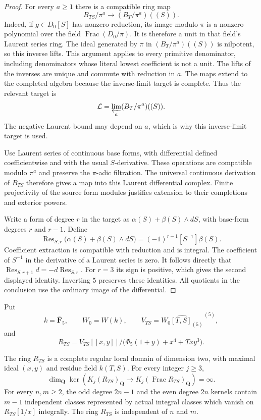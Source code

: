 \begin{proof}
For every $a\geq1$ there is a compatible ring map
\[
 B_{TS}/\pi^a
       \longrightarrow (B_T/\pi^a)((S)).
\]
Indeed, if $g\in D_0[S]$ has nonzero reduction, its image modulo
$\pi$ is a nonzero polynomial over the field
$\operatorname{Frac}(D_0/\pi)$.  It is therefore a unit in that
field's Laurent series ring.  The ideal generated by $\pi$ in
$(B_T/\pi^a)((S))$ is nilpotent, so this inverse lifts.  This
argument applies to every primitive denominator, including
denominators whose literal lowest coefficient is not a unit.
The lifts of the inverses are unique and commute with reduction
in $a$.  The maps extend to the completed algebra because the
inverse-limit target is complete.  Thus the relevant target is
\[
 \mathcal L=\varprojlim_a(B_T/\pi^a)((S)).
\]
The negative Laurent bound may depend on $a$, which is why this
inverse-limit target is used.

Use Laurent series of continuous base forms, with differential
defined coefficientwise and with the usual $S$-derivative.
These operations are compatible modulo $\pi^a$ and preserve
the $\pi$-adic filtration.  The universal continuous derivation
of $B_{TS}$ therefore gives a map into this Laurent differential
complex.  Finite projectivity of the source form modules
justifies extension to their completions and exterior powers.

Write a form of degree $r$ in the target as
$\alpha(S)+\beta(S)\wedge dS$, with base-form degrees $r$
and $r-1$.  Define
\[
 \operatorname{Res}_{S,r}
       \bigl(\alpha(S)+\beta(S)\wedge dS\bigr)
      =(-1)^{r-1}[S^{-1}]\beta(S).
\]
Coefficient extraction is compatible with reduction and is
integral.  The coefficient of $S^{-1}$ in the derivative of a
Laurent series is zero.  It follows directly that
$\operatorname{Res}_{S,r+1}d=-d\operatorname{Res}_{S,r}$.
For $r=3$ its sign is positive, which gives the second displayed
identity.  Inverting $5$ preserves these identities.  All
quotients in the conclusion use the ordinary image of the
differential.
\end{proof}

Put
\[
 k=\overline{\mathbf F}_5,\qquad W_0=W(k),\qquad
 V_{TS}=\widehat{W_0[T,S]_{(5)}}^{\,(5)},
\]
and
\[
 R_{TS}=V_{TS}[[x,y]]/
       \bigl(\Phi_5(1+y)+x^4+Txy^3\bigr).
\]

\begin{theorem}
\label{d2ext:dimtwoCompleteAllDegreesInfiniteRank}
The ring $R_{TS}$ is a complete regular local domain of dimension
two, with maximal ideal $(x,y)$ and residue field $k(T,S)$.
For every integer $j\geq3$,
\[
 \dim_{\mathbf Q}\ker\!\left(
 K_j(R_{TS})_{\mathbf Q}\longrightarrow
 K_j(\operatorname{Frac}R_{TS})_{\mathbf Q}\right)=\infty.
\]
For every $n,m\geq2$, the odd degree $2n-1$ and the even degree
$2n$ kernels contain $m-1$ independent classes represented by
actual integral classes which vanish on $R_{TS}[1/x]$ integrally.
The ring $R_{TS}$ is independent of $n$ and $m$.
\end{theorem}

